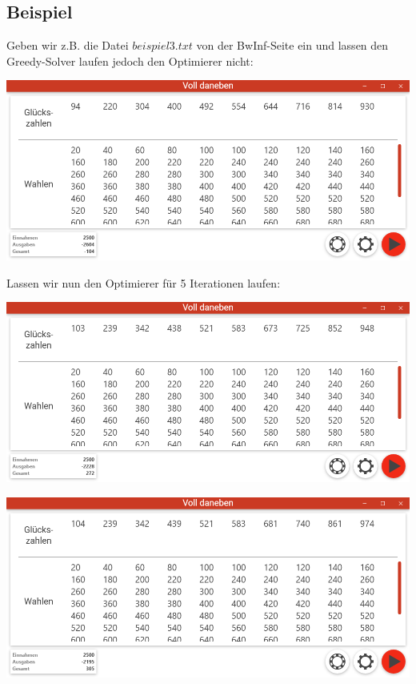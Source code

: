 \documentclass{article}
\begin{document}
\begin{flushleft}
\subsection{Beispiel}
Geben wir z.B. die Datei $beispiel3.txt$ von der BwInf-Seite ein und lassen den Greedy-Solver laufen jedoch den Optimierer nicht:\\
\begin{center}
\includegraphics[scale=.5]{0}
\end{center}
\newpage
Lassen wir nun den Optimierer für 5 Iterationen laufen:\\
\begin{center}
\includegraphics[scale=.5]{5}
\end{center}

\begin{center}
\includegraphics[scale=.5]{50}
\end{center}


\end{flushleft}
\end{document}
